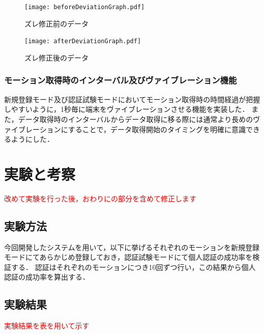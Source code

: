 \documentclass[11pt]{jreport}
\begin{document}
        \begin{figure}[tbp]
            \begin{minipage}{0.5\hsize}
                \begin{center}
                    \texttt{[image: beforeDeviationGraph.pdf]}
                \end{center}
                \caption{ズレ修正前のデータ}
                \label{beforeDeviationDataGraph}
            \end{minipage}
            \begin{minipage}{0.5\hsize}
                \begin{center}
                    \texttt{[image: afterDeviationGraph.pdf]}
                \end{center}
                \caption{ズレ修正後のデータ}
                \label{afterDeviationDataGraph}
            \end{minipage}
        \end{figure}

        \subsection{モーション取得時のインターバル及びヴァイブレーション機能}
        新規登録モード及び認証試験モードにおいてモーション取得時の時間経過が把握しやすいように，1秒毎に端末をヴァイブレーションさせる機能を実装した．
        また，データ取得時のインターバルからデータ取得に移る際には通常より長めのヴァイブレーションにすることで，データ取得開始のタイミングを明確に意識できるようにした．

\chapter{実験と考察}
    \textcolor{red}{改めて実験を行った後，おわりにの部分を含めて修正します}
	\section{実験方法}
	今回開発したシステムを用いて，以下に挙げるそれぞれのモーションを新規登録モードにてあらかじめ登録しておき，認証試験モードにて個人認証の成功率を検証する．
    認証はそれぞれのモーションにつき10回ずつ行い，この結果から個人認証の成功率を算出する．

	\section{実験結果}
	\textcolor{red}{実験結果を表を用いて示す}
\end{document}
